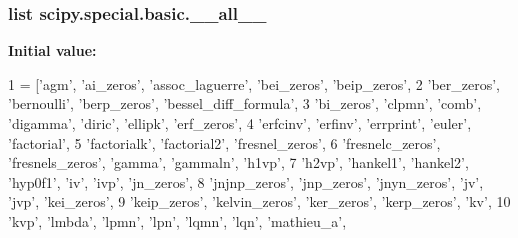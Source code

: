 \subsubsection[{\+\_\+\+\_\+all\+\_\+\+\_\+}]{\setlength{\rightskip}{0pt plus 5cm}list scipy.\+special.\+basic.\+\_\+\+\_\+all\+\_\+\+\_\+}\label{namespacescipy_1_1special_1_1basic_a48172f8d753d274415af5625e7a69f5d}
{\bfseries Initial value\+:}
\begin{DoxyCode}
1 = [\textcolor{stringliteral}{'agm'}, \textcolor{stringliteral}{'ai\_zeros'}, \textcolor{stringliteral}{'assoc\_laguerre'}, \textcolor{stringliteral}{'bei\_zeros'}, \textcolor{stringliteral}{'beip\_zeros'},
2            \textcolor{stringliteral}{'ber\_zeros'}, \textcolor{stringliteral}{'bernoulli'}, \textcolor{stringliteral}{'berp\_zeros'}, \textcolor{stringliteral}{'bessel\_diff\_formula'},
3            \textcolor{stringliteral}{'bi\_zeros'}, \textcolor{stringliteral}{'clpmn'}, \textcolor{stringliteral}{'comb'}, \textcolor{stringliteral}{'digamma'}, \textcolor{stringliteral}{'diric'}, \textcolor{stringliteral}{'ellipk'}, \textcolor{stringliteral}{'erf\_zeros'},
4            \textcolor{stringliteral}{'erfcinv'}, \textcolor{stringliteral}{'erfinv'}, \textcolor{stringliteral}{'errprint'}, \textcolor{stringliteral}{'euler'}, \textcolor{stringliteral}{'factorial'},
5            \textcolor{stringliteral}{'factorialk'}, \textcolor{stringliteral}{'factorial2'}, \textcolor{stringliteral}{'fresnel\_zeros'},
6            \textcolor{stringliteral}{'fresnelc\_zeros'}, \textcolor{stringliteral}{'fresnels\_zeros'}, \textcolor{stringliteral}{'gamma'}, \textcolor{stringliteral}{'gammaln'}, \textcolor{stringliteral}{'h1vp'},
7            \textcolor{stringliteral}{'h2vp'}, \textcolor{stringliteral}{'hankel1'}, \textcolor{stringliteral}{'hankel2'}, \textcolor{stringliteral}{'hyp0f1'}, \textcolor{stringliteral}{'iv'}, \textcolor{stringliteral}{'ivp'}, \textcolor{stringliteral}{'jn\_zeros'},
8            \textcolor{stringliteral}{'jnjnp\_zeros'}, \textcolor{stringliteral}{'jnp\_zeros'}, \textcolor{stringliteral}{'jnyn\_zeros'}, \textcolor{stringliteral}{'jv'}, \textcolor{stringliteral}{'jvp'}, \textcolor{stringliteral}{'kei\_zeros'},
9            \textcolor{stringliteral}{'keip\_zeros'}, \textcolor{stringliteral}{'kelvin\_zeros'}, \textcolor{stringliteral}{'ker\_zeros'}, \textcolor{stringliteral}{'kerp\_zeros'}, \textcolor{stringliteral}{'kv'},
10            \textcolor{stringliteral}{'kvp'}, \textcolor{stringliteral}{'lmbda'}, \textcolor{stringliteral}{'lpmn'}, \textcolor{stringliteral}{'lpn'}, \textcolor{stringliteral}{'lqmn'}, \textcolor{stringliteral}{'lqn'}, \textcolor{stringliteral}{'mathieu\_a'},

\end{DoxyCode}
